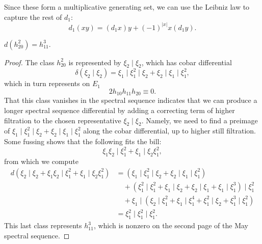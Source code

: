 \begin{subappendices}
\noindent
{}
Since these form a multiplicative generating set, we can use the Leibniz law to capture the rest of $d_1$: \[d_1(x y) = (d_1 x) y + (-1)^{|x|} x (d_1 y).\]

\begin{lemma}
$d(h_{20}^2) = h_{11}^3$.
\end{lemma}
\begin{proof}
The class $h_{20}^2$ is represented by $\xi_2 \mid \xi_2$, which has cobar differential \[\delta(\xi_2 \mid \xi_2) = \xi_1 \mid \xi_1^2 \mid \xi_2 + \xi_2 \mid \xi_1 \mid \xi_1^2,\] which in turn represents on $E_1$ \[2 h_{10} h_{11} h_{20} \equiv 0.\]
That this class vanishes in the spectral sequence indicates that we can produce a longer spectral sequence differential by adding a correcting term of higher filtration to the chosen representative $\xi_2 \mid \xi_2$.
Namely, we need to find a preimage of $\xi_1 \mid \xi_1^2 \mid \xi_2 + \xi_2 \mid \xi_1 \mid \xi_1^2$ along the cobar differential, up to higher still filtration.
Some fussing shows that the following fits the bill: \[\xi_1 \xi_2 \mid \xi_1^2 + \xi_1 \mid \xi_2 \xi_1^2,\] from which we compute
\begin{align*}
d(\xi_2 \mid \xi_2 + \xi_1 \xi_2 \mid \xi_1^2 + \xi_1 \mid \xi_2 \xi_1^2)
&       = (\xi_1 \mid \xi_1^2 \mid \xi_2 + \xi_2 \mid \xi_1 \mid \xi_1^2) \\
& \quad + (\xi_1^2 \mid \xi_1^2 + \xi_1 \mid \xi_2 + \xi_2 \mid \xi_1 + \xi_1 \mid \xi_1^3) \mid \xi_1^2 \\
& \quad + \xi_1 \mid (\xi_2 \mid \xi_1^2 + \xi_1 \mid \xi_1^4 + \xi_1^2 \mid \xi_2 + \xi_1^3 \mid \xi_1^2) \\
& = \xi_1^2 \mid \xi_1^2 \mid \xi_1^2.
\end{align*}
This last class represents $h_{11}^3$, which is nonzero on the second page of the May spectral sequence.
\end{proof}


\end{subappendices}
